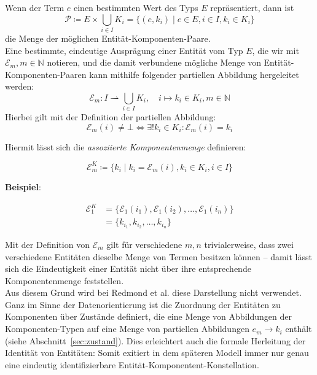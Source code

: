 \noindent
Wenn der Term $e$ einen bestimmten Wert des Typs $E$ repräsentiert, dann ist
\[
    \mathcal{P} \coloneqq E \times \bigcup_{i \in I} K_i = \{(e, k_i) \mid e \in E, i \in I, k_i \in K_i\}
\]
die Menge der möglichen Entität-Komponenten-Paare.\\

\bigskip
Eine bestimmte, eindeutige Ausprägung einer Entität vom Typ $E$, die wir mit $\mathcal{E}_m, m \in \mathbb{N}$ notieren, und die damit verbundene mögliche Menge von Entität-Komponenten-Paaren kann mithilfe folgender partiellen Abbildung hergeleitet werden:
\[
    \mathcal{E}_m :  I \rightharpoonup \bigcup_{i \in I} K_i, \quad i \mapsto k_i \in K_i, m \in \mathbb{N}
\]
Hierbei gilt mit der Definition der partiellen Abbildung:
\[
    \mathcal{E}_m(i) \neq \bot \Leftrightarrow \exists{!} k_i \in K_i : \mathcal{E}_m(i) = k_i
\]

\noindent
Hiermit lässt sich die \textit{assoziierte Komponentenmenge} definieren:

\[
    \mathcal{E}^K_m \coloneqq \{k_i \mid k_i = \mathcal{E}_m(i), k_i \in K_i, i \in I \}
\]

\noindent
\textbf{Beispiel}:

\[
    \begin{alignat}{3}
    \mathcal{E}^K_{1} &= \{\mathcal{E}_{1}(i_1), \mathcal{E}_{1}(i_2), \ldots, \mathcal{E}_{1}(i_n)\}\\
            &= \{k_{i_1}, k_{i_2}, \ldots, k_{i_n}\}
    \end{alignat}
\]

\vspace{5mm}
\noindent
Mit der Definition von $\mathcal{E}_m$ gilt für verschiedene $m, n$ trivialerweise, dass zwei verschiedene Entitäten dieselbe Menge von Termen besitzen können -- damit lässt sich die Eindeutigkeit einer Entität nicht über ihre entsprechende Komponentenmenge feststellen.\\

Aus diesem Grund wird bei Redmond et al. diese Darstellung nicht verwendet.
Ganz im Sinne der Datenorientierung ist die Zuordnung der Entitäten zu Komponenten über Zustände definiert, die eine Menge von Abbildungen der Komponenten-Typen auf eine Menge von partiellen Abbildungen $e_m \rightarrow k_i$ enthält (siehe Abschnitt~\ref{sec:zustand}).
Dies erleichtert auch die formale Herleitung der Identität von Entitäten: Somit exitiert in dem späteren Modell immer nur genau eine eindeutig identifizierbare Entität-Komponentent-Konstellation.
\bigskip

